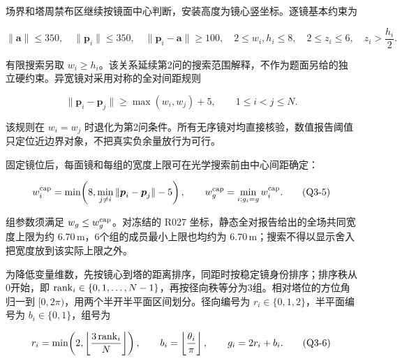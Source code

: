 \documentclass[UTF8,fontset=windows,zihao=-4]{ctexart}
\begin{document}
\par\noindent\begin{minipage}{\linewidth}
场界和塔周禁布区继续按镜面中心判断，安装高度为镜心竖坐标。逐镜基本约束为

\[
\|\boldsymbol a\|\le350,\quad
\|\boldsymbol p_i\|\le350,\quad
\|\boldsymbol p_i-\boldsymbol a\|\ge100,\quad
2\le w_i,h_i\le8,\quad
2\le z_i\le6,\quad
z_i>\frac{h_i}{2}.
\tag{Q3-3}
\]
\end{minipage}\par

\par\noindent\begin{minipage}{\linewidth}
有限搜索另取 \(w_i\ge h_i\)。该关系延续第2问的搜索范围解释，不作为题面另给的独立硬约束。异宽镜对采用对称的全对间距规则

\[
\|\boldsymbol p_i-\boldsymbol p_j\|
\ge \max(w_i,w_j)+5,
\qquad 1\le i<j\le N .
\tag{Q3-4}
\]
\end{minipage}\par

该规则在 \(w_i=w_j\) 时退化为第2问条件。所有无序镜对均直接核验，数值报告阈值只定位近边界对象，不把真实负余量放行为可行。

\par\noindent\begin{minipage}{\linewidth}
固定镜位后，每面镜和每组的宽度上限可在光学搜索前由中心间距确定：

\[
w_i^{\rm cap}
=\min\!\left(8,\min_{j\ne i}\|\boldsymbol p_i-\boldsymbol p_j\|-5\right),
\qquad
w_g^{\rm cap}=\min_{i:g_i=g}w_i^{\rm cap}.
\tag{Q3-5}
\]
\end{minipage}\par

组参数须满足 \(w_g\le w_g^{\rm cap}\)。对冻结的 R027 坐标，静态全对报告给出的全场共同宽度上限为约 \(6.70\,\mathrm m\)，6个组的成员最小上限也均约为 \(6.70\,\mathrm m\)；搜索不得以显示舍入把宽度放到该实际上限之外。

\par\noindent\begin{minipage}{\linewidth}
为降低变量维数，先按镜心到塔的距离排序，同距时按稳定镜身份排序；排序秩从0开始，即 \({\rm rank}_i\in\{0,1,\ldots,N-1\}\)，再按径向秩等分为3组。相对塔位的方位角归一到 \([0,2\pi)\)，用两个半开半平面区间划分。径向编号为 \(r_i\in\{0,1,2\}\)，半平面编号为 \(b_i\in\{0,1\}\)，组号为

\[
r_i=\min\!\left(2,\left\lfloor\frac{3\,{\rm rank}_i}{N}\right\rfloor\right),
\qquad
b_i=\left\lfloor\frac{\theta_i}{\pi}\right\rfloor,
\qquad
g_i=2r_i+b_i .
\tag{Q3-6}
\]
\end{minipage}\par
\end{document}
